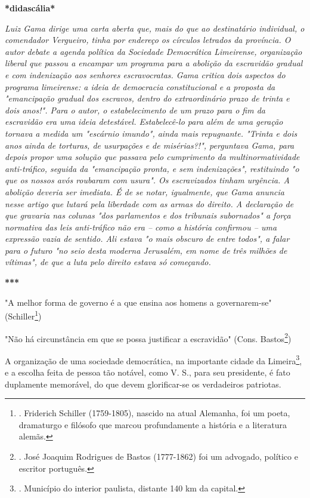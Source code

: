 \textbf{*didascália*}

\emph{Luiz Gama dirige uma carta aberta que, mais do que ao destinatário
individual, o comendador Vergueiro, tinha por endereço os círculos
letrados da província. O autor debate a agenda política da Sociedade
Democrática Limeirense, organização liberal que passou a encampar um
programa para a abolição da escravidão gradual e com indenização aos
senhores escravocratas. Gama critica dois aspectos do programa
limeirense: a ideia de democracia constitucional e a proposta da
"emancipação gradual dos escravos, dentro do extraordinário prazo de
trinta e dois anos!". Para o autor, o estabelecimento de um prazo para o
fim da escravidão era uma ideia detestável. Estabelecê-lo para além de
uma geração tornava a medida um "escárnio imundo", ainda mais
repugnante. "Trinta e dois anos ainda de torturas, de usurpações e de
misérias?!", perguntava Gama, para depois propor uma solução que passava
pelo cumprimento da multinormatividade anti-tráfico, seguida da
"emancipação pronta, e sem indenizações", restituindo "o que os nossos
avós roubaram com usura". Os escravizados tinham urgência. A abolição
deveria ser imediata. É de se notar, igualmente, que Gama anuncia nesse
artigo que lutará pela liberdade com as armas do direito. A declaração
de que gravaria nas colunas "dos parlamentos e dos tribunais subornados"
a força normativa das leis anti-tráfico não era -- como a história
confirmou -- uma expressão vazia de sentido. Ali estava "o mais obscuro
de entre todos", a falar para o futuro "no seio desta moderna Jerusalém,
em nome de três milhões de vítimas", de que a luta pelo direito estava
só começando.}

\textbf{***}

"A melhor forma de governo é a que ensina aos homens a governarem-se"
(Schiller\footnote{. Friderich Schiller (1759-1805), nascido na atual
  Alemanha, foi um poeta, dramaturgo e filósofo que marcou profundamente
  a história e a literatura alemãs.})

"Não há circunstância em que se possa justificar a escravidão" (Cons.
Bastos\footnote{. José Joaquim Rodrigues de Bastos (1777-1862) foi um
  advogado, político e escritor português.})

A organização de uma sociedade democrática, na importante cidade da
Limeira\footnote{. Município do interior paulista, distante 140 km da
  capital.}, e a escolha feita de pessoa tão notável, como V. S., para
seu presidente, é fato duplamente memorável, do que devem glorificar-se
os verdadeiros patriotas.

